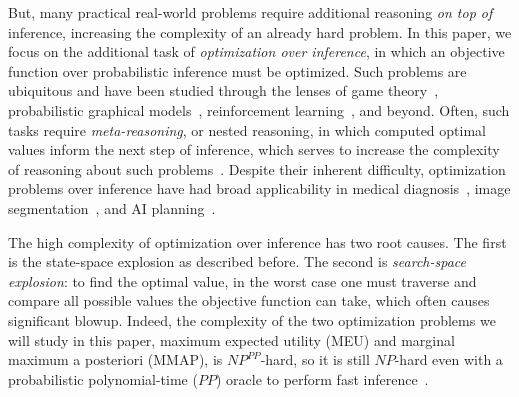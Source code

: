 But, many practical real-world problems require additional reasoning \textit{on top of} inference,
increasing the complexity of an already hard problem.
In this paper, we focus on the additional task of \textit{optimization over inference},
in which an objective function over probabilistic inference must be optimized.
Such problems are ubiquitous and have been studied through the lenses of
game theory~\citep{osborne2004introduction},
probabilistic graphical models~\citep{howard2002comments,puterman1978modified,koller2009probabilistic},
reinforcement learning~\citep{busoniu2008comprehensive},
and beyond.
Often, such tasks require \textit{meta-reasoning}, or nested reasoning,
in which computed optimal values inform the next step of inference, which
serves to increase the complexity of reasoning about such problems~\citep{lew2023probabilistic,rainforth2018nesting,zhang2022reasoning}.
Despite their inherent difficulty,
optimization problems over inference have had broad applicability in
medical diagnosis~\citep{heckerman1992toward,lee2014applying},
image segmentation~\citep{bioucas2016bayesian},
and AI planning~\citep{kiselev2014policy}.

The high complexity of optimization over inference has two root causes.
The first is the state-space explosion as described before.
The second is \textit{search-space explosion}: to find the optimal value,
in the worst case one must traverse and compare all possible values the objective function can take,
which often causes significant blowup.
Indeed, the complexity of the two optimization problems we will study in this paper,
maximum expected utility (MEU) and marginal maximum a posteriori (MMAP),
is $NP^{PP}$-hard, so it is still $NP$-hard even with a probabilistic polynomial-time ($PP$) oracle
to perform fast inference~\citep{maua2016equivalences}.

